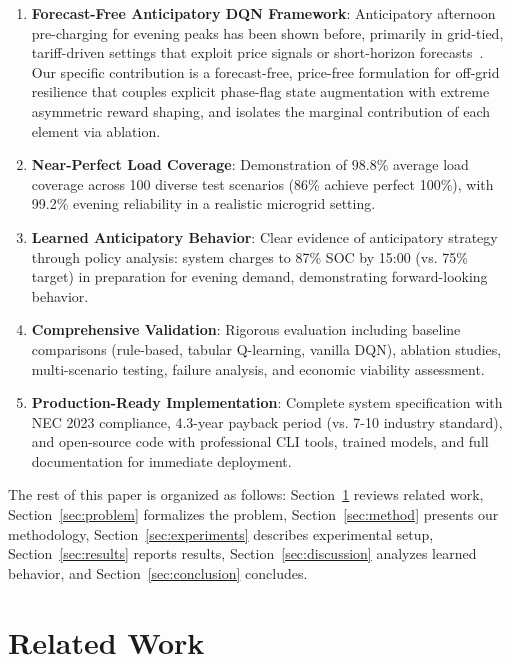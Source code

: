 \documentclass[11pt,a4paper]{article}
\begin{document}
\begin{enumerate}
    \item \textbf{Forecast-Free Anticipatory DQN Framework}: Anticipatory afternoon pre-charging for evening peaks has been shown before, primarily in grid-tied, tariff-driven settings that exploit price signals or short-horizon forecasts~\cite{muriithi2022,dualq2023}. Our specific contribution is a forecast-free, price-free formulation for off-grid resilience that couples explicit phase-flag state augmentation with extreme asymmetric reward shaping, and isolates the marginal contribution of each element via ablation.
    
    \item \textbf{Near-Perfect Load Coverage}: Demonstration of 98.8\% average load coverage across 100 diverse test scenarios (86\% achieve perfect 100\%), with 99.2\% evening reliability in a realistic microgrid setting.
    
    \item \textbf{Learned Anticipatory Behavior}: Clear evidence of anticipatory strategy through policy analysis: system charges to 87\% SOC by 15:00 (vs. 75\% target) in preparation for evening demand, demonstrating forward-looking behavior.
    
    \item \textbf{Comprehensive Validation}: Rigorous evaluation including baseline comparisons (rule-based, tabular Q-learning, vanilla DQN), ablation studies, multi-scenario testing, failure analysis, and economic viability assessment.
    
    \item \textbf{Production-Ready Implementation}: Complete system specification with NEC 2023 compliance, 4.3-year payback period (vs. 7-10 industry standard), and open-source code with professional CLI tools, trained models, and full documentation for immediate deployment.
\end{enumerate}

The rest of this paper is organized as follows: Section~\ref{sec:related} reviews related work, Section~\ref{sec:problem} formalizes the problem, Section~\ref{sec:method} presents our methodology, Section~\ref{sec:experiments} describes experimental setup, Section~\ref{sec:results} reports results, Section~\ref{sec:discussion} analyzes learned behavior, and Section~\ref{sec:conclusion} concludes.

\section{Related Work}
\label{sec:related}
\end{document}
